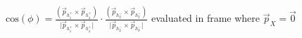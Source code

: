 \documentclass[border={2pt 1pt 2pt 1pt}]{standalone}
\begin{document}
$\mathrm{cos}(\phi) = \frac{(\vec{p}_{h_1^+}\times\vec{p}_{h_4^+})}{\lvert\vec{p}_{h_1^+}\times\vec{p}_{h_4^+}\rvert}\cdot\frac{(\vec{p}_{h_2^-}\times\vec{p}_{h_3^-})}{\lvert\vec{p}_{h_2^-}\times\vec{p}_{h_3^-}\rvert}$ \quad
evaluated in frame where $\vec{p}_{X} = \vec{0}$
\end{document}
